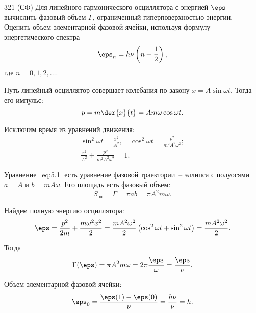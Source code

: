 \documentclass[pscyr]{hedwork}
\begin{document}
  \begin{task}{321 (СФ)}{
    Для линейного гармонического осциллятора с энергией \( \eps \) вычислить
    фазовый объем \( \Gamma \), ограниченный гиперповерхностью энергии. Оценить
    объем элементарной фазовой ячейки, используя формулу энергетического спектра
    \[
      \eps_n = h\nu \left(n + \frac{1}{2}\right),
    \]
    где \( n = 0, 1, 2, \ldots \).
  }
  
    Путь линейный осциллятор совершает колебания по закону
    \( x = A\sin\omega t \). Тогда его импульс:
    \[
      p = m\der{x}{t} = Am\omega\cos\omega t.
    \]
    
    Исключим время из уравнений движения:
    \begin{gather}
      \sin^2\omega t = \frac{x^2}{A^2}, \quad \cos^2\omega t =
        \frac{p^2}{m^2A^2\omega^2}; \nonumber \\
      \frac{x^2}{A^2} + \frac{p^2}{m^2A^2\omega^2} = 1. \label{eq:5.1}
    \end{gather}
    
    Уравнение~\eqref{eq:5.1} есть уравнение фазовой траектории~-- эллипса с
    полуосями \( a = A \) и \( b = mA\omega \). Его площадь есть фазовый объем:
    \[
      S_\text{эл} = \Gamma = \pi ab = \pi A^2m\omega.
    \]
    
    Найдем полную энергию осциллятора:
    \[
      \eps = \frac{p^2}{2m} + \frac{m\omega^2x^2}{2} =
        \frac{mA^2\omega^2}{2}\left(\cos^2\omega t + \sin^2\omega t\right) =
        \frac{mA^2\omega^2}{2}.
    \]
    
    Тогда
    \[
      \Gamma(\eps) = \pi A^2m\omega = 2\pi\frac{\eps}{\omega} =
        \frac{\eps}{\nu}.
    \]
    
    Объем элементарной фазовой ячейки:
    \[
      \eps_0 = \frac{\eps(1) - \eps(0)}{\nu} = \frac{h\nu}{\nu} = h.
    \]

  \end{task}
\end{document}
